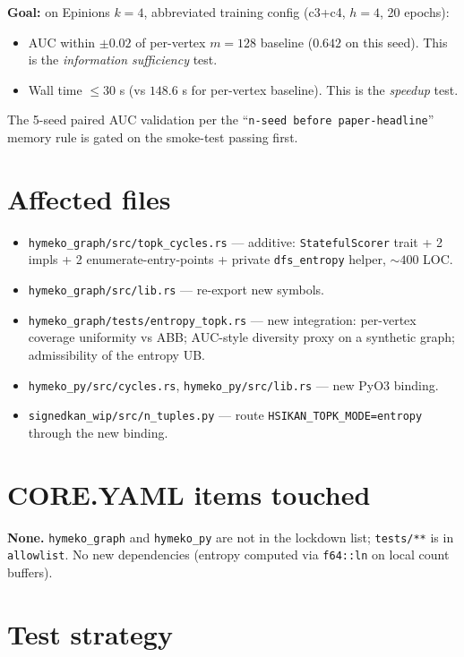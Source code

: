 \documentclass[a4paper,11pt]{article}
\begin{document}
\textbf{Goal:} on Epinions $k{=}4$, abbreviated training config
(c3+c4, $h{=}4$, 20 epochs):
\begin{itemize}
  \item AUC within $\pm 0.02$ of per-vertex $m{=}128$ baseline ($0.642$
    on this seed).  This is the \emph{information sufficiency} test.
  \item Wall time $\le 30$ s (vs $148.6$ s for per-vertex baseline).
    This is the \emph{speedup} test.
\end{itemize}
The 5-seed paired AUC validation per the
``\texttt{n-seed before paper-headline}'' memory rule is gated on
the smoke-test passing first.

\section*{Affected files}

\begin{itemize}
  \item \texttt{hymeko\_graph/src/topk\_cycles.rs} --- additive:
    \texttt{StatefulScorer} trait + 2 impls + 2 enumerate-entry-points
    + private \texttt{dfs\_entropy} helper, $\sim 400$ LOC.
  \item \texttt{hymeko\_graph/src/lib.rs} --- re-export new symbols.
  \item \texttt{hymeko\_graph/tests/entropy\_topk.rs} --- new
    integration: per-vertex coverage uniformity vs ABB; AUC-style
    diversity proxy on a synthetic graph; admissibility of the
    entropy UB.
  \item \texttt{hymeko\_py/src/cycles.rs},
    \texttt{hymeko\_py/src/lib.rs} --- new PyO3 binding.
  \item \texttt{signedkan\_wip/src/n\_tuples.py} --- route
    \texttt{HSIKAN\_TOPK\_MODE=entropy} through the new binding.
\end{itemize}

\section*{CORE.YAML items touched}

\textbf{None.} \texttt{hymeko\_graph} and \texttt{hymeko\_py} are
not in the lockdown list; \texttt{tests/**} is in
\texttt{allowlist}.  No new dependencies (entropy computed via
\texttt{f64::ln} on local count buffers).

\section*{Test strategy}
\end{document}
